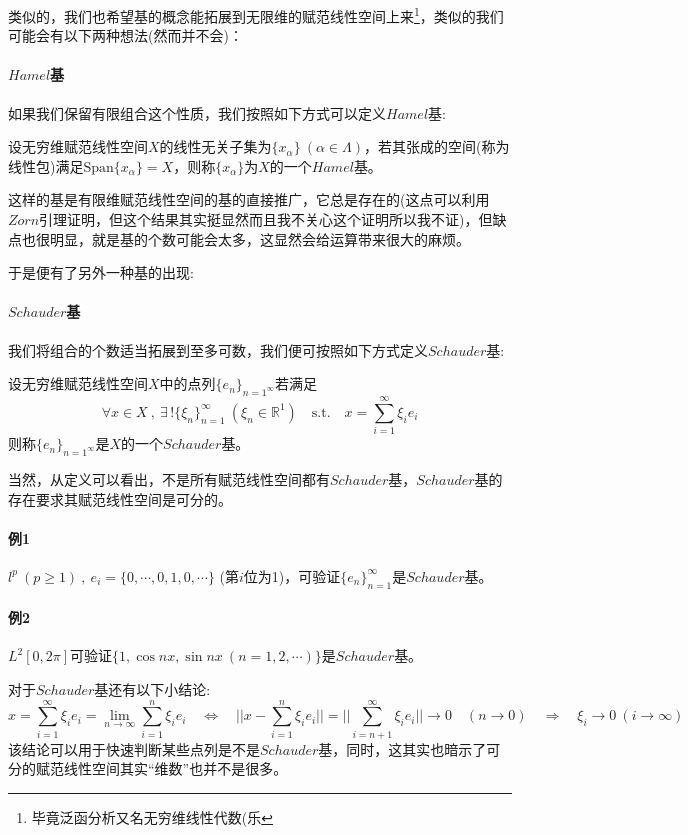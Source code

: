 类似的，我们也希望基的概念能拓展到无限维的赋范线性空间上来\footnote{毕竟泛函分析又名无穷维线性代数(乐}，类似的我们可能会有以下两种想法(然而并不会)：
\paragraph*{$Hamel$基}
如果我们保留有限组合这个性质，我们按照如下方式可以定义$Hamel$基:
\begin{definition}[$Hamel$基]
    设无穷维赋范线性空间$X$的线性无关子集为$\{x_{\alpha}\} \ (\alpha \in \Lambda)$，若其张成的空间(称为线性包)满足$\text{Span}\{x_{\alpha}\}=X$，则称$\{x_{\alpha}\}$为$X$的一个$Hamel$基。
\end{definition}
这样的基是有限维赋范线性空间的基的直接推广，它总是存在的(这点可以利用$Zorn$引理证明，但这个结果其实挺显然而且我不关心这个证明所以我不证)，但缺点也很明显，就是基的个数可能会太多，这显然会给运算带来很大的麻烦。

于是便有了另外一种基的出现:
\paragraph*{$Schauder$基}
我们将组合的个数适当拓展到至多可数，我们便可按照如下方式定义$Schauder$基:
\begin{definition}[$Schauder$基]
    设无穷维赋范线性空间$X$中的点列$\{e_n\}_{n=1^{\infty}}$若满足
    \[\forall x \in X \ , \ \exists \, !\{\xi_n\}_{n=1}^{\infty} \ (\xi_n \in \mathbb{R}^1) \quad \text{s.t.} \quad x=\sum_{i=1}^{\infty}\xi_ie_i\]
    则称$\{e_n\}_{n=1^{\infty}}$是$X$的一个$Schauder$基。
\end{definition}
当然，从定义可以看出，不是所有赋范线性空间都有$Schauder$基，$Schauder$基的存在要求其赋范线性空间是可分的。
\paragraph*{例1} \quad $l^p \ (p \geq 1) \ , \ e_i=\{0,\cdots,0,1,0,\cdots\}$ (第$i$位为1)，可验证$\{e_n\}_{n=1}^{\infty}$是$Schauder$基。
\paragraph*{例2} \quad $L^2[0,2\pi]$可验证$\{1,\cos nx,\sin nx \ (n=1,2,\cdots)\}$是$Schauder$基。

对于$Schauder$基还有以下小结论:
\[x=\sum_{i=1}^{\infty}\xi_ie_i=\lim_{n \to \infty}\sum_{i=1}^{n}\xi_ie_i \quad \Leftrightarrow \quad ||x-\sum_{i=1}^n\xi_ie_i||=||\sum_{i=n+1}^{\infty}\xi_ie_i|| \rightarrow 0 \quad (n \rightarrow 0) \quad \Rightarrow \quad \xi_i \rightarrow 0 \ (i \to \infty)\]
该结论可以用于快速判断某些点列是不是$Schauder$基，同时，这其实也暗示了可分的赋范线性空间其实“维数”也并不是很多。

